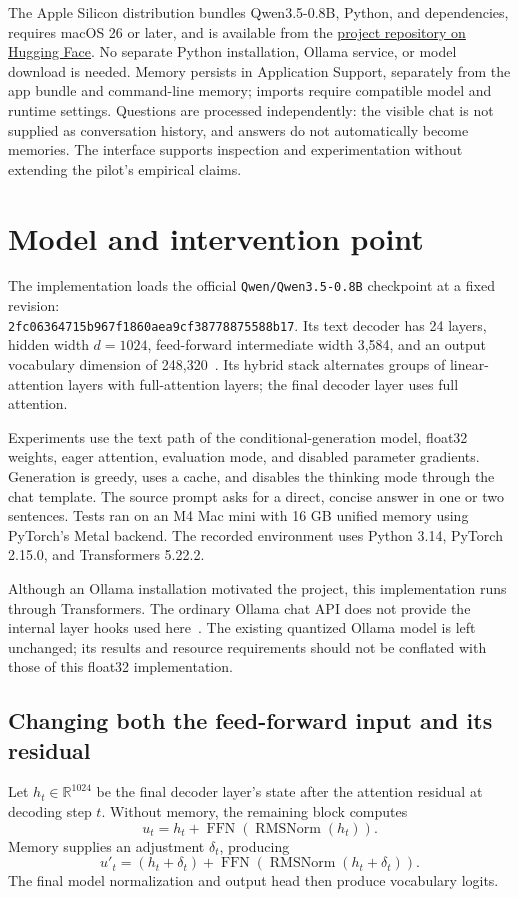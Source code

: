 \documentclass[manuscript,screen,nonacm]{acmart}
\begin{document}
The Apple Silicon distribution bundles Qwen3.5-0.8B, Python, and dependencies, requires macOS 26 or later, and is available from the \href{https://huggingface.co/will-taggart/LAMP-Qwen-v0.1}{project repository on Hugging Face}. No separate Python installation, Ollama service, or model download is needed. Memory persists in Application Support, separately from the app bundle and command-line memory; imports require compatible model and runtime settings. Questions are processed independently: the visible chat is not supplied as conversation history, and answers do not automatically become memories. The interface supports inspection and experimentation without extending the pilot's empirical claims.

\section{Model and intervention point}
The implementation loads the official \nolinkurl{Qwen/Qwen3.5-0.8B} checkpoint at a fixed revision:\\ {\small\nolinkurl{2fc06364715b967f1860aea9cf38778875588b17}}. Its text decoder has 24 layers, hidden width $d=1024$, feed-forward intermediate width 3,584, and an output vocabulary dimension of 248,320~\cite{qwen}. Its hybrid stack alternates groups of linear-attention layers with full-attention layers; the final decoder layer uses full attention.

Experiments use the text path of the conditional-generation model, float32 weights, eager attention, evaluation mode, and disabled parameter gradients. Generation is greedy, uses a cache, and disables the thinking mode through the chat template. The source prompt asks for a direct, concise answer in one or two sentences. Tests ran on an M4 Mac mini with 16 GB unified memory using PyTorch's Metal backend. The recorded environment uses Python 3.14, PyTorch 2.15.0, and Transformers 5.22.2.

Although an Ollama installation motivated the project, this implementation runs through Transformers. The ordinary Ollama chat API does not provide the internal layer hooks used here~\cite{ollama}. The existing quantized Ollama model is left unchanged; its results and resource requirements should not be conflated with those of this float32 implementation.

\subsection{Changing both the feed-forward input and its residual}
Let $h_t\in\mathbb{R}^{1024}$ be the final decoder layer's state after the attention residual at decoding step $t$. Without memory, the remaining block computes
\begin{equation}
u_t=h_t+\operatorname{FFN}\!\left(\operatorname{RMSNorm}(h_t)\right).
\end{equation}
Memory supplies an adjustment $\delta_t$, producing
\begin{equation}
u'_t=(h_t+\delta_t)+
\operatorname{FFN}\!\left(\operatorname{RMSNorm}(h_t+\delta_t)\right).
\label{eq:intervention}
\end{equation}
The final model normalization and output head then produce vocabulary logits.
\end{document}

